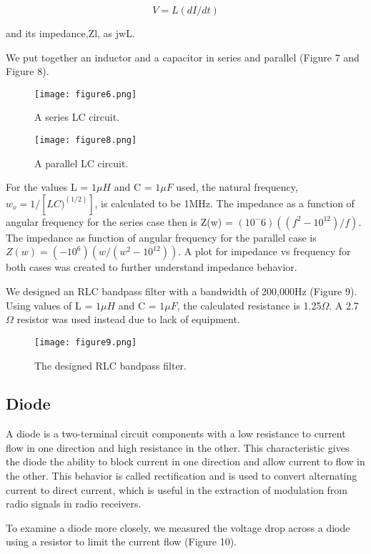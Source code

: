 \documentclass[12pt]{article}
\begin{document}
\begin{equation}
V = L(dI/dt)
\end{equation} 

and its impedance,Zl, as jwL.

We put together an inductor and a capacitor in series and parallel
(Figure 7 and Figure 8).

\begin {figure}[!h]
\centering
\texttt{[image: figure6.png]}
\caption{\label{rvd} A series LC circuit. }
\end {figure}

\begin {figure}[!h]
\centering
\texttt{[image: figure8.png]}
\caption{\label{rvd} A parallel LC circuit. }
\end {figure}

For the values L = $1\mu H$ and C = $1\mu F$ used, the natural frequency, 
$w_o = 1/[LC)^(1/2)]$, is calculated to be 1MHz. The impedance as a
function of angular frequency for the series case then is Z(w) =
$(10^-6)((f^2-10^12)/f)$. The impedance as function of angular frequency
for the parallel case is $Z(w) = (-10^6)(w/(w^2-10^{12}))$. A plot for
impedance vs frequency for both cases was created to further understand
impedance behavior. 

We designed an RLC bandpass filter with a bandwidth of 200,000Hz (Figure
9). Using values of  L = $1\mu H$ and C = $1\mu F$, the calculated resistance is
1.25$\Omega$. A 2.7$\Omega$ resistor was used instead due to lack of
equipment. 

\begin {figure}[!h]
\centering
\texttt{[image: figure9.png]}
\caption{\label{rvd} The designed RLC bandpass filter. }
\end {figure}

\subsection {Diode}
A diode is a two-terminal circuit components with a low resistance to
current flow in one direction and high resistance in the other. This
characteristic gives the diode the ability to block current in one
direction and allow current to flow in the other. This behavior is
called rectification and is used to convert alternating current to
direct current, which is useful in the extraction of modulation from
radio signals in radio receivers.

To examine a diode more closely, we measured the voltage drop across a
diode using a resistor to limit the current flow (Figure 10).
\end{document}
